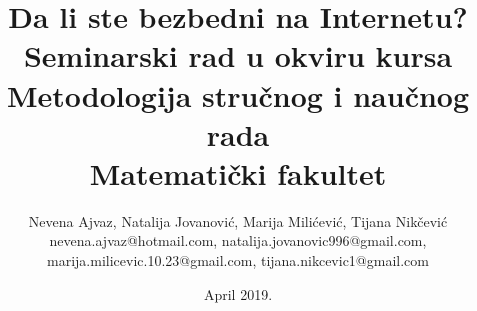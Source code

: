\documentclass[a4paper]{article}
\theoremstyle{break}
\begin{document}
\title{Da li ste bezbedni na Internetu?\\ \small{Seminarski rad u okviru kursa\\Metodologija stručnog i naučnog rada\\ Matematički fakultet}}

\author{Nevena Ajvaz, Natalija Jovanović, Marija Milićević, Tijana Nikčević\\ nevena.ajvaz@hotmail.com, natalija.jovanovic996@gmail.com,\\
marija.milicevic.10.23@gmail.com, tijana.nikcevic1@gmail.com}

\date{April 2019.}


\maketitle
\end{document}
